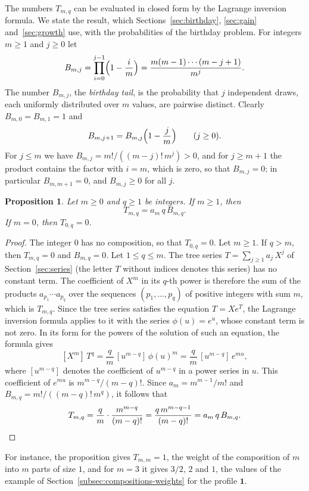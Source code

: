 \documentclass{amsart}
\newtheorem{proposition}[theorem]{Proposition}
\theoremstyle{definition}
\theoremstyle{remark}
\numberwithin{equation}{section}
\begin{document}
The numbers $T_{m,q}$ can be evaluated in closed form by the Lagrange
inversion formula. We state the result, which
Sections~\ref{sec:birthday}, \ref{sec:gain} and~\ref{sec:growth} use, with
the probabilities of the birthday problem. For
integers $m\ge1$ and $j\ge0$ let
\[
B_{m,j}=\prod_{i=0}^{j-1}\Bigl(1-\frac im\Bigr)
=\frac{m(m-1)\cdots(m-j+1)}{m^{j}}.
\]
The number $B_{m,j}$, the \emph{birthday tail}, is the probability that $j$
independent draws, each uniformly distributed over $m$ values, are pairwise
distinct. Clearly $B_{m,0}=B_{m,1}=1$ and
\begin{equation}\label{eq:compositions-tail}
B_{m,j+1}=B_{m,j}\Bigl(1-\frac jm\Bigr)\qquad(j\ge0).
\end{equation}
For $j\le m$ we have $B_{m,j}=m!/((m-j)!\,m^{j})>0$, and for $j\ge m+1$ the
product contains the factor with $i=m$, which is zero, so that $B_{m,j}=0$;
in particular $B_{m,m+1}=0$, and $B_{m,j}\ge0$ for all $j$.

\begin{proposition}\label{prop:partslaw}
Let $m\ge0$ and $q\ge1$ be integers. If $m\ge1$, then
\[
T_{m,q}=a_m\,q\,B_{m,q}.
\]
If $m=0$, then $T_{0,q}=0$.
\end{proposition}

\begin{proof}
The integer $0$ has no composition, so that $T_{0,q}=0$. Let $m\ge1$. If
$q>m$, then $T_{m,q}=0$ and $B_{m,q}=0$. Let $1\le q\le m$. The tree series
$T=\sum_{j\ge1}a_j\,X^j$ of Section~\ref{sec:series} (the letter $T$ without
indices denotes this series) has no constant term. The coefficient of $X^m$
in its $q$-th power is therefore the sum of the products
$a_{p_1}\cdots a_{p_q}$ over the sequences $(p_1,\dots,p_q)$ of positive
integers with sum $m$, which is $T_{m,q}$. Since the tree series satisfies
the equation $T=Xe^{T}$, the Lagrange inversion formula
\cite[Theorem~A.2]{flajoletsedgewick2009} applies to it with the series
$\phi(u)=e^{u}$, whose constant term is not zero. In its form for the powers
of the solution of such an equation, the formula gives
\[
[X^m]\,T^q=\frac qm\,[u^{m-q}]\,\phi(u)^m=\frac qm\,[u^{m-q}]\,e^{mu},
\]
where $[u^{m-q}]$ denotes the coefficient of $u^{m-q}$ in a power series in
$u$. This coefficient of $e^{mu}$ is $m^{m-q}/(m-q)!$. Since
$a_m=m^{m-1}/m!$ and $B_{m,q}=m!/((m-q)!\,m^{q})$, it follows that
\[
T_{m,q}=\frac qm\cdot\frac{m^{m-q}}{(m-q)!}=\frac{q\,m^{m-q-1}}{(m-q)!}
=a_m\,q\,B_{m,q}.\qedhere
\]
\end{proof}

For instance, the proposition gives $T_{m,m}=1$, the weight of the
composition of $m$ into $m$ parts of size $1$, and for $m=3$ it gives
$3/2$, $2$ and $1$, the values of the example of
Section~\ref{subsec:compositions-weights} for the profile $\mathbf 1$.
\end{document}
